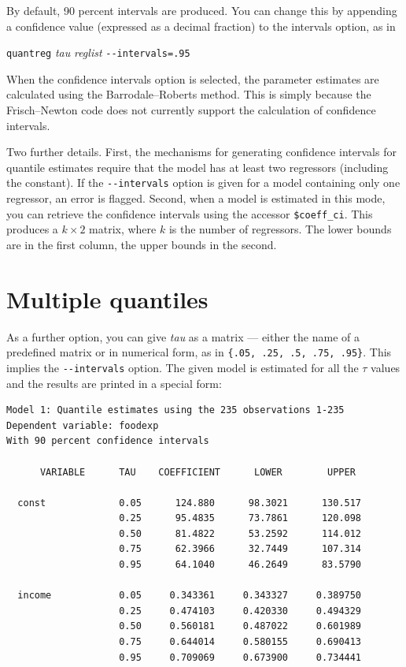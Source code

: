 By default, 90 percent intervals are produced.  You can change this by
appending a confidence value (expressed as a decimal fraction) to the
intervals option, as in

\vspace{1em}
\noindent
\qquad \texttt{quantreg} \textsl{tau} \textsl{reglist} \verb|--intervals=.95|
\vspace{1em}

When the confidence intervals option is selected, the parameter
estimates are calculated using the Barrodale--Roberts method.  This is
simply because the Frisch--Newton code does not currently support the
calculation of confidence intervals.

Two further details.  First, the mechanisms for generating confidence
intervals for quantile estimates require that the model has at least
two regressors (including the constant).  If the \verb|--intervals|
option is given for a model containing only one regressor, an error is
flagged.  Second, when a model is estimated in this mode, you can
retrieve the confidence intervals using the accessor \verb|$coeff_ci|.
This produces a $k \times 2$ matrix, where $k$ is the number of
regressors.  The lower bounds are in the first column, the upper
bounds in the second.

\section{Multiple quantiles}

As a further option, you can give \textsl{tau} as a matrix --- either
the name of a predefined matrix or in numerical form, as in
\verb+{.05, .25, .5, .75, .95}+.  This implies the \verb|--intervals|
option.  The given model is estimated for all the $\tau$ values and
the results are printed in a special form:

{\small
\begin{verbatim}
Model 1: Quantile estimates using the 235 observations 1-235
Dependent variable: foodexp
With 90 percent confidence intervals

      VARIABLE      TAU    COEFFICIENT      LOWER        UPPER

  const             0.05      124.880      98.3021      130.517
                    0.25      95.4835      73.7861      120.098
                    0.50      81.4822      53.2592      114.012
                    0.75      62.3966      32.7449      107.314
                    0.95      64.1040      46.2649      83.5790

  income            0.05     0.343361     0.343327     0.389750
                    0.25     0.474103     0.420330     0.494329
                    0.50     0.560181     0.487022     0.601989
                    0.75     0.644014     0.580155     0.690413
                    0.95     0.709069     0.673900     0.734441
\end{verbatim}
}

